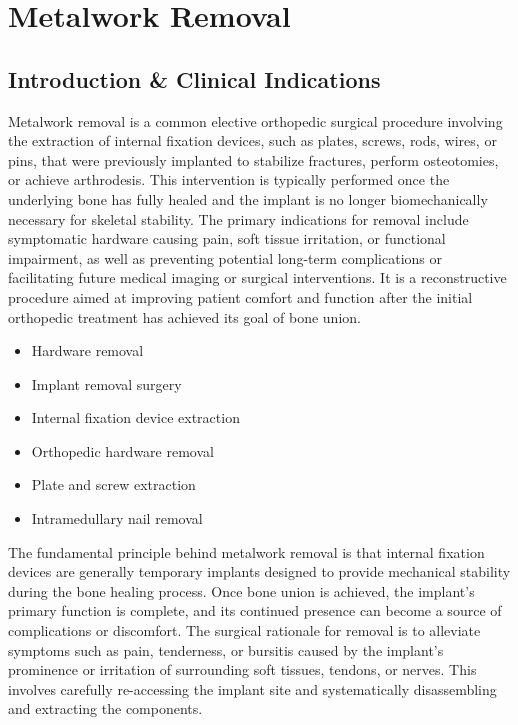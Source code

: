\chapter{Metalwork Removal}

\section*{Introduction \& Clinical Indications}
Metalwork removal is a common elective orthopedic surgical procedure involving the extraction of internal fixation devices, such as plates, screws, rods, wires, or pins, that were previously implanted to stabilize fractures, perform osteotomies, or achieve arthrodesis. This intervention is typically performed once the underlying bone has fully healed and the implant is no longer biomechanically necessary for skeletal stability. The primary indications for removal include symptomatic hardware causing pain, soft tissue irritation, or functional impairment, as well as preventing potential long-term complications or facilitating future medical imaging or surgical interventions. It is a reconstructive procedure aimed at improving patient comfort and function after the initial orthopedic treatment has achieved its goal of bone union.

\begin{itemize}
  \item Hardware removal
  \item Implant removal surgery
  \item Internal fixation device extraction
  \item Orthopedic hardware removal
  \item Plate and screw extraction
  \item Intramedullary nail removal
\end{itemize}

The fundamental principle behind metalwork removal is that internal fixation devices are generally temporary implants designed to provide mechanical stability during the bone healing process. Once bone union is achieved, the implant's primary function is complete, and its continued presence can become a source of complications or discomfort. The surgical rationale for removal is to alleviate symptoms such as pain, tenderness, or bursitis caused by the implant's prominence or irritation of surrounding soft tissues, tendons, or nerves. This involves carefully re-accessing the implant site and systematically disassembling and extracting the components.

